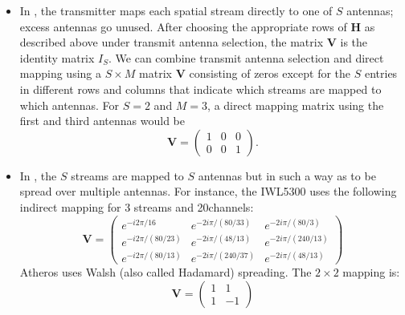 \begin{itemize}
	\item In , the transmitter maps each spatial stream directly to one of $S$ antennas; excess antennas go unused. After choosing the appropriate rows of $\mathbf{H}$ as described above under transmit antenna selection, the matrix $\mathbf{V}$ is the identity matrix $I_S$. We can combine transmit antenna selection and direct mapping using a $S \times M$ matrix $\mathbf{V}$ consisting of zeros except for the $S$ entries in different rows and columns that indicate which streams are mapped to which antennas. For $S=2$ and $M=3$, a direct mapping matrix using the first and third antennas would be
	\begin{equation*}
		\tag{Combined $2\times3$ TX Antenna Selection and Direct Mapping}
		\mathbf{V} = \begin{pmatrix}
		1 & 0 & 0\\
		0 & 0 & 1
		\end{pmatrix}.
	\end{equation*}

	\item In , the $S$ streams are mapped to $S$ antennas but in such a way as to be spread over multiple antennas. For instance, the IWL5300 uses the following indirect mapping for 3 streams and 20\MHz channels:
	\begin{equation*}
		\tag{IWL5300 $3\times3$}
		\mathbf{V} = \begin{pmatrix}
		e^{-i2\pi/16} & e^{-2i\pi/(80/33)} & e^{-2i\pi/(80/3)} \\
		e^{-i2\pi/(80/23)} & e^{-2i\pi/(48/13)} & e^{-2i\pi/(240/13)} \\
		e^{-i2\pi/(80/13)} & e^{-2i\pi/(240/37)} & e^{-2i\pi/(48/13)}
		\end{pmatrix}
	\end{equation*}
	Atheros uses Walsh (also called Hadamard) spreading. The $2\times2$ mapping is:
	\begin{equation*}
		\tag{Atheros $2\times2$}
		\mathbf{V} = \begin{pmatrix}
		1 & 1\\
		1 & -1
		\end{pmatrix}
	\end{equation*}
	

\end{itemize}
